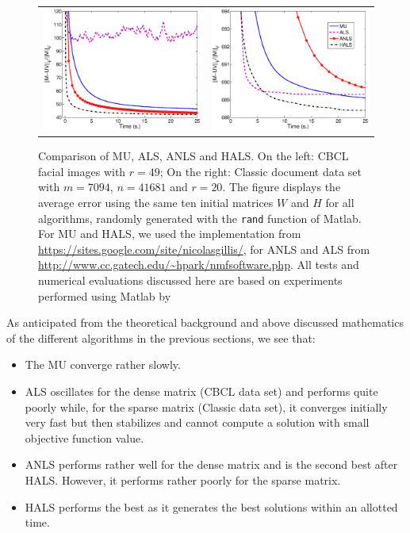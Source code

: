 \documentclass[11pt]{article}
\begin{document}
\begin{figure}[ht!]
\begin{center}
\begin{tabular}{cc}
\includegraphics[width=8cm]{cbcl.eps}  & \includegraphics[width=8cm]{classic.eps}  \\
\end{tabular}
\end{center} 
\caption{\small Comparison of MU, ALS, ANLS and HALS. On the left: CBCL facial images with $r=49$; On the right: Classic document data set with $m=7094$, $n = 41681$ and $r= 20$. The figure displays the average error using the same ten initial matrices $W$ and $H$ for all algorithms, randomly generated with the \texttt{rand} function of Matlab. For MU and HALS, we used the implementation from \protect\url{https://sites.google.com/site/nicolasgillis/}, for ANLS and ALS from \protect\url{http://www.cc.gatech.edu/~hpark/nmfsoftware.php}. All tests and numerical evaluations discussed here are based on experiments performed using Matlab by \protect\cite{f47}}
\label{fig5}
\end{figure} 
\newpage
As anticipated from the theoretical background and above discussed mathematics of the different algorithms in the previous sections, we see that:
\begin{itemize}
\item The MU converge rather slowly.
\item ALS oscillates for the dense matrix (CBCL data set) and performs quite poorly while, for the
sparse matrix (Classic data set), it converges initially very fast but then stabilizes and cannot
compute a solution with small objective function value.
\item ANLS performs rather well for the dense matrix and is the second best after HALS. However,
it performs rather poorly for the sparse matrix.
\item HALS performs the best as it generates the best solutions within an allotted time.\\
\end{itemize}
\end{document}
